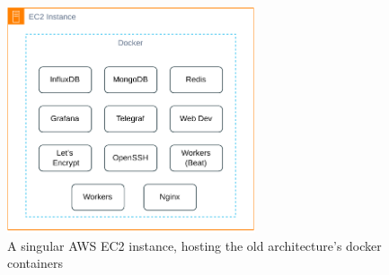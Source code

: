\begin{figure}[!htbp]
    \centering
    \includegraphics[width=0.65\textwidth]{img/diagrams/pdf/old-arch.drawio.pdf}
    \caption[AWS EC2 Instance Overview]{A singular AWS EC2 instance, hosting the old architecture's docker containers}
    \label{fig:old-arch.drawio.pdf}
\end{figure}
    